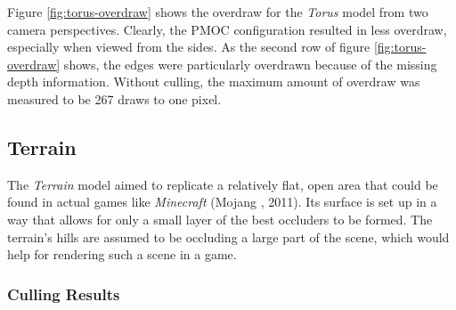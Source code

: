 \noindent
Figure \ref{fig:torus-overdraw} shows the overdraw for the \emph{Torus} model from two 
camera perspectives. Clearly, the \ac{PMOC} configuration resulted in less overdraw, 
especially when viewed from the sides. As the second row of figure \ref{fig:torus-overdraw} 
shows, the edges were particularly overdrawn because of the missing depth information. 
Without culling, the maximum amount of overdraw was measured to be 267 draws to one pixel.


\clearpage



\subsection*{Terrain}

The \emph{Terrain} model aimed to replicate a relatively flat, open area that could be found in actual 
games like \emph{Minecraft} (Mojang \cite{Mojang2024}, 2011). Its surface is set up in a way that allows 
for only a small layer of the best occluders to be formed. The terrain's hills are assumed to be occluding 
a large part of the scene, which would help for rendering such a scene in a game.

\subsubsection*{Culling Results} \label{subsubsec-culling-results-terrain}


